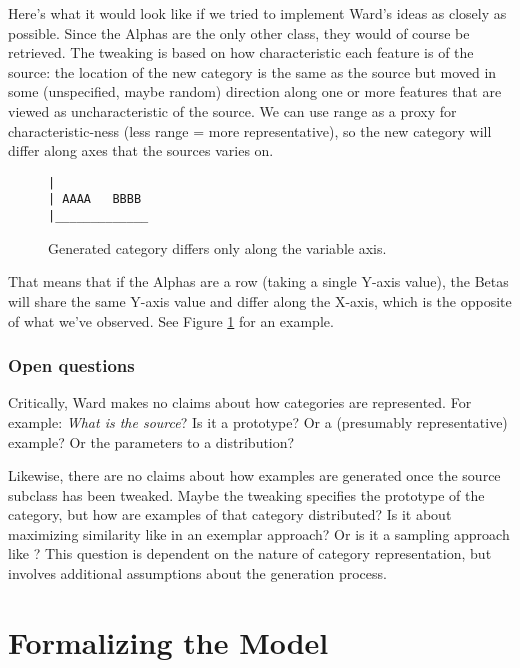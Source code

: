 \documentclass[12pt]{article}
\begin{document}
Here's what it would look like if we tried to implement Ward's ideas as closely as possible. Since the Alphas are the only other class, they would of course be retrieved. The tweaking is based on how characteristic each feature is of the source: the location of the new category is the same as the source but moved in some (unspecified, maybe random) direction along one or more features that are viewed as uncharacteristic of the source. We can use range as a proxy for characteristic-ness (less range = more representative), so the new category will differ along axes that the sources varies on. 

\begin{figure}[ht]
    \begin{center}
    \begin{BVerbatim}
|
| AAAA   BBBB
|_____________
    \end{BVerbatim}
    \caption{Generated category differs only along the variable axis.}
    \label{fig:AB-Sample}
    \end{center}
\end{figure}

That means that if the Alphas are a row (taking a single Y-axis value), the Betas will share the same Y-axis value and differ along the X-axis, which is the opposite of what we've observed. See Figure \ref{fig:AB-Sample} for an example. 

\subsubsection{Open questions}

Critically, Ward makes no claims about how categories are represented. For example: \textit{What is the source}? Is it a prototype? Or a (presumably representative) example? Or the parameters to a distribution? 

Likewise, there are no claims about how examples are generated once the source subclass has been tweaked. Maybe the tweaking specifies the prototype of the category, but how are examples of that category distributed? Is it about maximizing similarity like in an exemplar approach? Or is it a sampling approach like \cite{jern2013probabilistic}? This question is dependent on the nature of category representation, but involves additional assumptions about the generation process. 

\section{Formalizing the Model}
\end{document}
